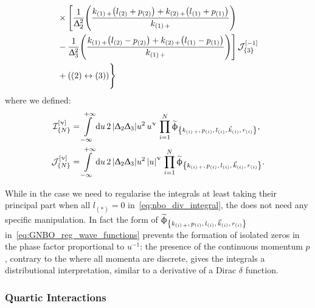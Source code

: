 \begin{equation}
\begin{split}
      & \times
      \Biggl[
          \frac{1}{\Delta_2^2}
          \qty(%
            \frac{k_{\qty(1)\, +} \qty( l_{(2)} + p_{(2)} )
                  +
                  k_{\qty(2)\, +} \qty( l_{(1)} + p_{(1)} )}{k_{\qty(1)\, +}}
          )
          \\
          & -
          \frac{1}{\Delta_3^2}
          \qty(%
            \frac{k_{\qty(1)\, +} \qty( l_{(2)} - p_{(2)} )
                  +
                  k_{\qty(2)\, +} \qty( l_{(1)} - p_{(1)} )} {k_{\qty(1)\, +}}
          )
      \Biggr]\,
      \cJ_{\qty{3}}^{\qty[-1]}
      \\
      & +
      \qty( (2) \leftrightarrow (3) )
    \Biggr\rbrace
  \end{split}
\end{equation}
where we defined:
\begin{equation}
  \begin{split}
    \mathcal{I}_{\qty{N}}^{\qty[\upnu]}
    & =
    \int\limits_{-\infty}^{+\infty} \dd{u}
    2\, \abs{\Updelta_2 \Updelta_3} u^2\, u^{\upnu}\, \prod\limits_{i = 1}^{N} \widetilde{\upphi}_{\qty{k_{\qty(i)\, +},\, p_{\qty(i)},\, l_{\qty(i)},\, \vec{k}_{\qty(i)},\, r_{\qty(i)}}},
    \\
    \mathcal{J}_{\qty{N}}^{\qty[\upnu]}
    & =
    \int\limits_{-\infty}^{+\infty} \dd{u}
    2\, \abs{\Updelta_2 \Updelta_3} u^2\, \abs{u}^{\upnu}\, \prod\limits_{i = 1}^{N} \widetilde{\upphi}_{\qty{k_{\qty(i)\, +},\, p_{\qty(i)},\, l_{\qty(i)},\, \vec{k}_{\qty(i)},\, r_{\qty(i)}}}.
  \end{split}
\end{equation}


While in the \nbo case we need to regularise the integrals at least taking their principal part when all $l_{(*)} = 0$ in~\eqref{eq:nbo_div_integral}, the \gnbo does not need any specific manipulation.
In fact the form of $\widetilde{\upphi}_{\qty{k_{\qty(i)\, +},\, p_{\qty(i)},\, l_{\qty(i)},\, \vec{k}_{\qty(i)},\, r_{\qty(i)}}}$ in~\eqref{eq:GNBO_reg_wave_functions} prevents the formation of isolated zeros in the phase factor proportional to $u^{-1}$: the presence of the continuous momentum $p$, contrary to the \nbo where all momenta are discrete, gives the integrals a distributional interpretation, similar to a derivative of a Dirac $\delta$ function.


\subsubsection{Quartic Interactions}

